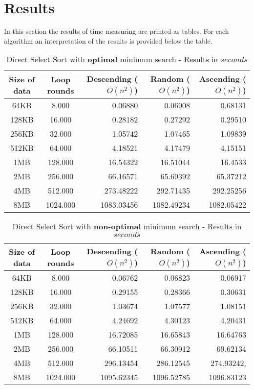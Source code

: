 \documentclass[11pt]{amsart}
\begin{document}
\newpage
\section{Results}
In this section the results of time measuring are printed as tables. For each algorithm an interpretation of the results is provided below the table.
%
%
\begin{table}[htdp]
	\caption{Direct Select Sort with \textbf{optimal} minimum search - Results in $seconds$}
	\begin{tabular}{|c|c|r|r|r|} \hline
		Size of data & Loop rounds & Descending ($O(n^2)$) & Random ($O(n^2)$) & Ascending ($O(n^2)$) \\ \hline
		64KB & 8.000 & 0.06880 & 0.06908 & 0.68131 \\ \hline
		128KB & 16.000 & 0.28182 & 0.27292 & 0.29510 \\ \hline
		256KB & 32.000& 1.05742 & 1.07465 & 1.09839 \\ \hline
		512KB & 64.000 & 4.18521 & 4.17479 & 4.15151 \\ \hline
		1MB & 128.000 & 16.54322 & 16.51044 & 16.4533 \\ \hline
		2MB & 256.000 & 66.16571 & 65.69392 & 65.37212 \\ \hline
		4MB & 512.000 & 273.48222 & 292.71435 & 292.25256 \\ \hline
		8MB & 1024.000 & 1083.03456 & 1082.49234 & 1082.05422 \\ \hline
	\end{tabular}
	\label{default}
\end{table}%

\begin{table}[htdp]
	\caption{Direct Select Sort with \textbf{non-optimal} minimum search - Results in $seconds$}
	\begin{tabular}{|c|c|r|r|r|} \hline
		Size of data & Loop rounds & Descending ($O(n^2)$) & Random ($O(n^2)$) & Ascending ($O(n^2)$) \\ \hline
		64KB & 8.000 & 0.06762 & 0.06823 & 0.06917 \\ \hline
		128KB & 16.000 & 0.29155 & 0.28366 & 0.30631 \\ \hline
		256KB & 32.000& 1.03674 & 1.07577 & 1.08151 \\ \hline
		512KB & 64.000 & 4.24692 & 4.30123 & 4.20431 \\ \hline
		1MB & 128.000 & 16.72085 & 16.65843 & 16.64763 \\ \hline
		2MB & 256.000 & 66.10511 & 66.30912 & 69.62134 \\ \hline
		4MB & 512.000 & 296.13454 & 286.12545 & 274.93242‚ \\ \hline
		8MB & 1024.000 & 1095.62345 & 1096.52785 & 1096.83123 \\ \hline
	\end{tabular}
	\label{default}
\end{table}%
\end{document}
